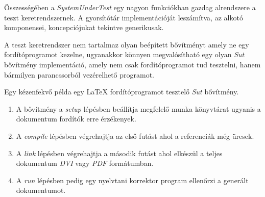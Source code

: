         Összességében a \textit{SystemUnderTest} egy nagyon funkciókban gazdag alrendszere a teszt keretrendszernek. A
        gyorsítótár implementációját leszámítva, az alkotó komponensei, koncepciójukat tekintve generikusak.

        A teszt keretrendszer nem tartalmaz olyan beépített bővítményt amely ne egy fordítóprogramot kezelne,
        ugyanakkor könnyen megvalósítható egy olyan \textit{Sut} bővítmény implementáció, amely nem csak
        fordítóprogramot tud tesztelni, hanem bármilyen parancssorból vezérelhető programot.

        Egy kézenfekvő példa egy \LaTeX{} fordítóprogramot tesztelő \textit{Sut} bővítmény.

        \begin{enumerate}
            \item A bővítmény a \textit{setup} lépésben beállítja megfelelő munka könyvtárat ugyanis a dokumentum
                  fordítók erre érzékenyek.
            \item A \textit{compile} lépésben végrehajtja az első futást ahol a referenciák még üresek.
            \item A \textit{link} lépésben végrehajtja a második futást ahol elkészül a teljes dokumentum \textit{DVI}
                  vagy \textit{PDF} formátumban.
            \item A \textit{run} lépésben pedig egy nyelvtani korrektor program ellenőrzi a generált dokumentumot.
        \end{enumerate}
